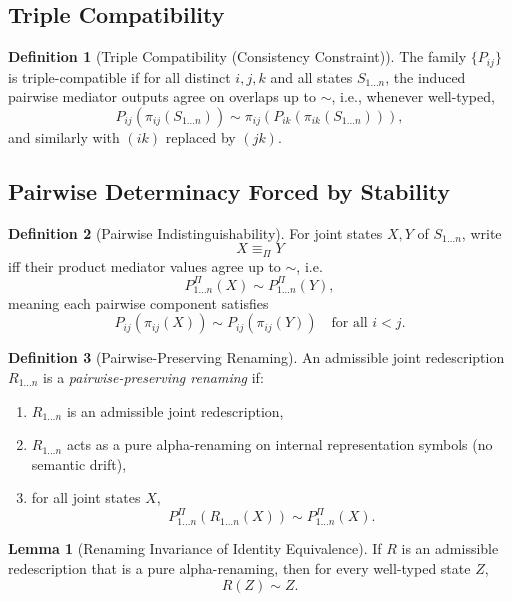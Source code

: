 \documentclass[11pt]{article}
\theoremstyle{definition}
\newtheorem{definition}{Definition}
\newtheorem{lemma}{Lemma}
\begin{document}
\subsection{Triple Compatibility}

\begin{definition}[Triple Compatibility (Consistency Constraint)]
The family $\{P_{ij}\}$ is triple-compatible if for all distinct $i,j,k$ and all states $S_{1\ldots n}$, the induced pairwise mediator outputs agree on overlaps up to $\sim$,
i.e., whenever well-typed,
\[
P_{ij}(\pi_{ij}(S_{1\ldots n})) \sim \pi_{ij}\!\left(P_{ik}(\pi_{ik}(S_{1\ldots n}))\right),
\]
and similarly with $(ik)$ replaced by $(jk)$.
\end{definition}


\subsection{Pairwise Determinacy Forced by Stability}

\begin{definition}[Pairwise Indistinguishability]
For joint states $X,Y$ of $S_{1\ldots n}$, write
\[
X \equiv_{\Pi} Y
\]
iff their product mediator values agree up to $\sim$, i.e.
\[
P^{\Pi}_{1\ldots n}(X) \sim P^{\Pi}_{1\ldots n}(Y),
\]
meaning each pairwise component satisfies
\[
P_{ij}(\pi_{ij}(X)) \sim P_{ij}(\pi_{ij}(Y))
\quad\text{for all } i<j.
\]
\end{definition}

\begin{definition}[Pairwise-Preserving Renaming]
An admissible joint redescription $R_{1\ldots n}$ is a \emph{pairwise-preserving renaming} if:
\begin{enumerate}[label=(\roman*)]
    \item $R_{1\ldots n}$ is an admissible joint redescription,
    \item $R_{1\ldots n}$ acts as a pure alpha-renaming on internal representation symbols (no semantic drift),
    \item for all joint states $X$,
    \[
    P^{\Pi}_{1\ldots n}(R_{1\ldots n}(X)) \sim P^{\Pi}_{1\ldots n}(X).
    \]
\end{enumerate}
\end{definition}

\begin{lemma}[Renaming Invariance of Identity Equivalence]
If $R$ is an admissible redescription that is a pure alpha-renaming, then for every well-typed state $Z$,
\[
R(Z) \sim Z.
\]
\end{lemma}
\end{document}
